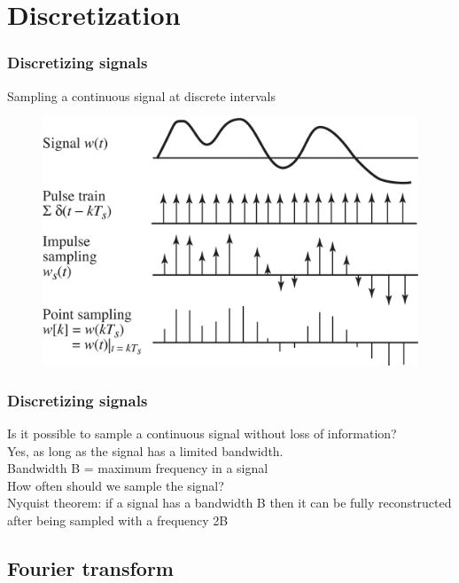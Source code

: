 \section{Discretization}

\begin{frame}
\frametitle{Discretizing signals}
Sampling a continuous signal at discrete intervals
\begin{figure}
	\includegraphics[width=.7\linewidth]{discretization}
\end{figure}
\end{frame}

\begin{frame}
\frametitle{Discretizing signals}
\vspace{-8ex}
Is it possible to sample a continuous signal without loss of information?\\
\smallskip
Yes, as long as the signal has a limited bandwidth.\\
Bandwidth B = maximum frequency in a signal\\
\bigskip
How often should we sample the signal?\\
\smallskip
Nyquist theorem: if a signal has a bandwidth B then it can be fully reconstructed after being sampled with a frequency 2B
\end{frame}

\subsection{Fourier transform}

